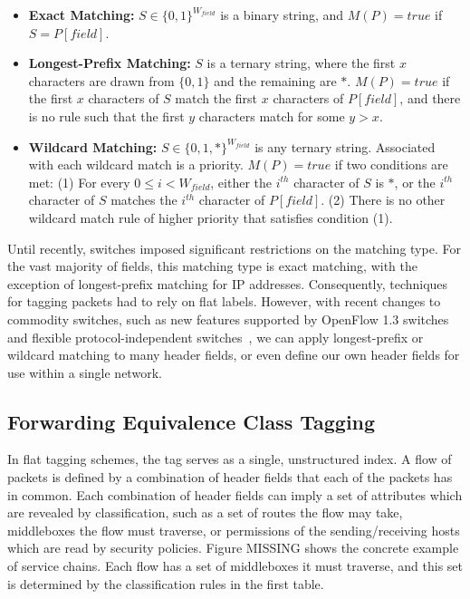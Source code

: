 \begin{itemize}
  \item \textbf{Exact Matching:} $S \in \{0,1\}^{W_{field}}$ is a binary string, and $M(P) = true$ if $S = P[field]$.\\
  \item \textbf{Longest-Prefix Matching:} $S$ is a ternary string, where the first $x$ characters are drawn from $\{0,1\}$ and the remaining are $*$. $M(P) = true$ if the first $x$ characters of $S$ match the first $x$ characters of $P[field]$, and there is no rule such that the first $y$ characters match for some $y > x$.\\
  \item \textbf{Wildcard Matching:} $S \in \{0,1,*\}^{W_{field}}$ is any ternary string. Associated with each wildcard match is a priority. $M(P) = true$ if two conditions are met: (1) For every $0 \le i < W_{field}$, either the $i^{th}$ character of $S$ is $*$, or the $i^{th}$ character of $S$ matches the $i^{th}$ character of $P[field]$. (2) There is no other wildcard match rule of higher priority that satisfies condition (1).
\end{itemize}
  
Until recently, switches imposed significant restrictions on the matching type.  For the vast majority of fields, this matching type is exact matching, with the exception of longest-prefix matching for IP addresses. Consequently, techniques for tagging packets had to rely on flat labels.  However, with recent changes to commodity switches, such as new features supported by OpenFlow 1.3 switches~\cite{of13} and flexible protocol-independent switches~\cite{P4}, we can apply longest-prefix or wildcard matching to many header fields, or even define our own header fields for use within a single network.

\subsection{Forwarding Equivalence Class Tagging}
In flat tagging schemes, the tag serves as a single, unstructured index.  A flow of packets is defined by a combination of header fields that each of the packets has in common. Each combination of header fields can imply a set of attributes which are revealed by classification, such as a set of routes the flow may take, middleboxes the flow must traverse, or permissions of the sending/receiving hosts which are read by security policies.  Figure MISSING shows the concrete example of service chains. Each flow has a set of middleboxes it must traverse, and this set is determined by the classification rules in the first table.

